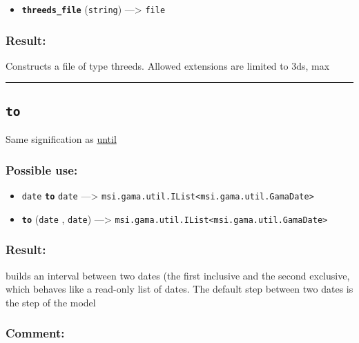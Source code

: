 \documentclass[]{book}
\providecommand{\tightlist}{%
  \setlength{\itemsep}{0pt}\setlength{\parskip}{0pt}}
\theoremstyle{definition}
\theoremstyle{definition}
\theoremstyle{definition}
\theoremstyle{remark}
\begin{document}
\begin{itemize}
\tightlist
\item
  \textbf{\texttt{threeds\_file}} (\texttt{string}) ---\textgreater{}
  \texttt{file}
\end{itemize}

\subsubsection{Result:}\label{result-501}

Constructs a file of type threeds. Allowed extensions are limited to
3ds, max

\begin{center}\rule{0.5\linewidth}{\linethickness}\end{center}

\subsection{\texorpdfstring{\texttt{to}}{to}}\label{to}

Same signification as \href{OperatorsSZ\#until}{until}

\subsubsection{Possible use:}\label{possible-use-519}

\begin{itemize}
\tightlist
\item
  \texttt{date} \textbf{\texttt{to}} \texttt{date} ---\textgreater{}
  \texttt{msi.gama.util.IList\textless{}msi.gama.util.GamaDate\textgreater{}}
\item
  \textbf{\texttt{to}} (\texttt{date} , \texttt{date}) ---\textgreater{}
  \texttt{msi.gama.util.IList\textless{}msi.gama.util.GamaDate\textgreater{}}
\end{itemize}

\subsubsection{Result:}\label{result-502}

builds an interval between two dates (the first inclusive and the second
exclusive, which behaves like a read-only list of dates. The default
step between two dates is the step of the model

\subsubsection{Comment:}\label{comment-99}
\end{document}
